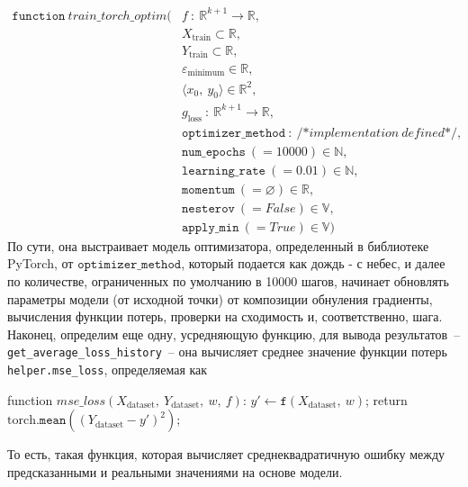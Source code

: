 \documentclass[12pt, a4paper, oneside, final]{article}
\begin{document}
	\begin{align*}
		\mathtt{function}~train\_torch\_optim(&f\ :\ \mathbb{R}^{k + 1} \to \mathbb{R}, \\
		& X_{\text{train}} \subset \mathbb{R}, \\
		& Y_{\text{train}} \subset \mathbb{R}, \\
		& \varepsilon_{\text{minimum}} \in \mathbb{R}, \\
		& \langle x_0, ~ y_0 \rangle \in \mathbb{R}^2, \\
		& g_{\text{loss}}\ :\ \mathbb{R}^{k + 1} \to \mathbb{R}, \\
		& \mathtt{optimizer\_method}\ :\ \text{/*}implementation~defined\text{*/}, \\
		& \mathtt{num\_epochs}~(= 10000) \in \mathbb{N}, \\
		& \mathtt{learning\_rate}~(= 0.01) \in \mathbb{N}, \\
		& \mathtt{momentum}~(= \varnothing) \in \mathbb{R}, \\
		& \mathtt{nesterov}~(= \textit{False}) \in \mathbb{V}, \\
		& \mathtt{apply\_min}~(= \textit{True}) \in \mathbb{V})
	\end{align*}
	По сути, она выстраивает модель оптимизатора, определенный в библиотеке PyTorch, от $\mathtt{optimizer\_method}$, который подается как дождь - с небес, и далее по количестве, ограниченных по умолчанию в 10000 шагов, начинает обновлять параметры модели (от исходной точки) от композиции обнуления градиенты, вычисления функции потерь, проверки на сходимость и, соответственно, шага.
	Наконец, определим еще одну, усредняющую функцию, для вывода результатов~-- \texttt{get\_average\_loss\_history}~-- она вычисляет среднее значение функции потерь \texttt{helper.mse\_loss}, определяемая как
	\begin{pseudocode}
function $mse\_loss(X_{\text{dataset}}, ~ Y_{\text{dataset}}, ~ w, ~ f)$:
	$y' \gets \mathtt{f}(X_{\text{dataset}}, ~ w)$;
	return $\text{torch}.\mathtt{mean}((Y_{\text{dataset}} - y')^2)$;
	\end{pseudocode}
	То есть, такая функция, которая вычисляет среднеквадратичную ошибку между предсказанными и реальными значениями на основе модели.
\end{document}
